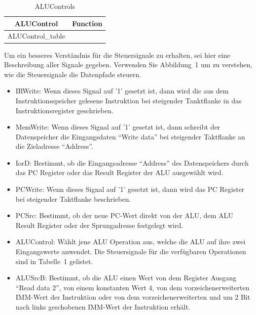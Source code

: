 \documentclass[a4paper,12pt]{article}
\newcommand\Tstrut{\rule{0pt}{2.6ex}}       %
\begin{document}
\begin{table}[h!]
\centering
    \begin{tabular}{|c|c|} \hline \Tstrut
		ALUControl & Function   \\ \hline \Tstrut
		{{ALUControl_table}}
    \hline
    \end{tabular}
    \caption{ALUControls}
    \label{tab:ALUControls}
\end{table}

Um ein besseres Verst\"andnis f\"ur die Steuersignale zu erhalten, sei hier eine Beschreibung aller Signale gegeben. Verwenden Sie Abbildung~1 um zu verstehen, wie die Steuersignale die Datenpfade steuern.

\begin{itemize}

\item{IRWrite: Wenn dieses Signal auf '1' gesetzt ist, dann wird die aus dem Instruktionsspeicher gelesene Instruktion bei steigender Tanktflanke in das Instruktionsregister geschrieben.}

\item{MemWrite: Wenn dieses Signal auf '1' gesetzt ist, dann schreibt der Datenspeicher die Eingangsdaten "`Write data"' bei steigender Taktflanke an die Zieladresse "`Address"'.}

\item{IorD: Bestimmt, ob die Eingangsadresse "`Address"' des Datenspeichers durch das PC Register oder das Result Register der ALU ausgew\"ahlt wird.}

\item{PCWrite: Wenn dieses Signal auf '1' gesetzt ist, dann wird das PC Register bei steigender Taktflanke beschrieben.}

\item{PCSrc: Bestimmt, ob der neue PC-Wert direkt von der ALU, dem ALU Result Register oder der Sprungadresse festgelegt wird.}

\item{ALUControl: W\"ahlt jene ALU Operation aus, welche die ALU auf ihre zwei Eingangswerte anwendet. Die Steuersignale f\"ur die verf\"ugbaren Operationen sind in Tabelle~1 gelistet.}

\item{ALUSrcB:  Bestimmt, ob die ALU einen Wert von dem Register Ausgang "`Read data 2"', von einem konstanten Wert 4, von dem vorzeichenerweiterten IMM-Wert der Instruktion oder von dem vorzeichenerweiterten und um 2 Bit nach links geschobenen IMM-Wert der Instruktion erh\"alt.}


\end{itemize}
\end{document}
